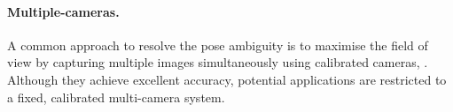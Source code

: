 \paragraph{Multiple-cameras.} 
A common approach to resolve the pose ambiguity is to maximise the field of view by capturing multiple images simultaneously using calibrated cameras, \eg \cite{Pons-Moll2011, Sigal2012, Yao2012}. Although they achieve excellent accuracy, potential applications are restricted to a fixed, calibrated multi-camera system. 
%
